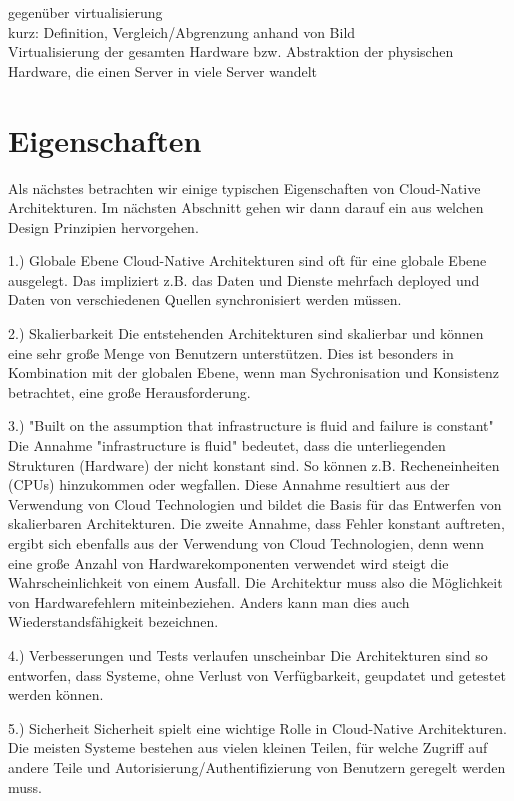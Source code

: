 gegenüber virtualisierung\\
kurz: Definition, Vergleich/Abgrenzung anhand von Bild\\

Virtualisierung der gesamten Hardware bzw. Abstraktion der physischen Hardware, die einen Server in viele Server wandelt\\

\section{Eigenschaften}
Als nächstes betrachten wir einige typischen Eigenschaften von Cloud-Native Architekturen. Im nächsten Abschnitt gehen wir dann darauf ein aus welchen Design Prinzipien hervorgehen.

1.) Globale Ebene
Cloud-Native Architekturen sind oft für eine globale Ebene ausgelegt. Das impliziert z.B. das Daten und Dienste mehrfach deployed und Daten von verschiedenen Quellen synchronisiert werden müssen.

2.) Skalierbarkeit
Die entstehenden Architekturen sind skalierbar und können eine sehr große Menge von Benutzern unterstützen. Dies ist besonders in Kombination mit der globalen Ebene, wenn man Sychronisation und Konsistenz betrachtet, eine große Herausforderung.

3.) "Built on the assumption that infrastructure is fluid and failure is constant"
Die Annahme "infrastructure is fluid" bedeutet, dass die unterliegenden Strukturen (Hardware) der nicht konstant sind. So können z.B. Recheneinheiten (CPUs) hinzukommen oder wegfallen. Diese Annahme resultiert aus der Verwendung von Cloud Technologien und bildet die Basis für das Entwerfen von skalierbaren Architekturen.
Die zweite Annahme, dass Fehler konstant auftreten, ergibt sich ebenfalls aus der Verwendung von Cloud Technologien, denn wenn eine große Anzahl von Hardwarekomponenten verwendet wird steigt die Wahrscheinlichkeit von einem Ausfall. Die Architektur muss also die Möglichkeit von Hardwarefehlern miteinbeziehen. Anders kann man dies auch Wiederstandsfähigkeit bezeichnen.

4.) Verbesserungen und Tests verlaufen unscheinbar
Die Architekturen sind so entworfen, dass Systeme, ohne Verlust von Verfügbarkeit, geupdatet und getestet werden können.

5.) Sicherheit
Sicherheit spielt eine wichtige Rolle in Cloud-Native Architekturen. Die meisten Systeme bestehen  aus vielen kleinen Teilen, für welche Zugriff auf andere Teile und Autorisierung/Authentifizierung von Benutzern geregelt werden muss.

